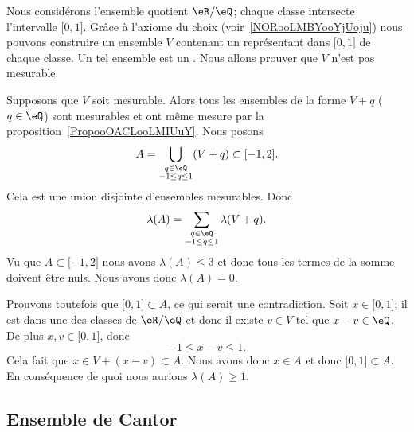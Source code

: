 \begin{example}      \label{EXooCZCFooRPgKjj}
    Nous considérons l'ensemble quotient \( \eR/\eQ\); chaque classe intersecte l'intervalle \( \mathopen[ 0 , 1 \mathclose]\). Grâce à l'axiome du choix (voir~\ref{NORooLMBYooYjUoju}) nous pouvons construire un ensemble \( V\) contenant un représentant dans \( \mathopen[ 0 , 1 \mathclose]\) de chaque classe. Un tel ensemble est un . Nous allons prouver que \( V\) n'est pas mesurable.

    Supposons que \( V\) soit mesurable. Alors tous les ensembles de la forme \( V+q\) (\( q\in \eQ\)) sont mesurables et ont même mesure par la proposition~\ref{PropooOACLooLMIUuY}. Nous posons
    \begin{equation}
        A=\bigcup_{\substack{q\in\eQ\\-1\leq q\leq 1}}(V+q)\subset\mathopen[ -1 , 2 \mathclose].
    \end{equation}
    Cela est une union disjointe d'ensembles mesurables. Donc
    \begin{equation}
        \lambda(A)=\sum_{\substack{q\in\eQ\\-1\leq q\leq 1}}\lambda(V+q).
    \end{equation}
    Vu que \( A\subset\mathopen[ -1 , 2 \mathclose]\) nous avons \( \lambda(A)\leq 3\) et donc tous les termes de la somme doivent être nuls. Nous avons donc \( \lambda(A)=0\).

    Prouvons toutefois que \( \mathopen[ 0 , 1 \mathclose]\subset A\), ce qui serait une contradiction. Soit \( x\in\mathopen[ 0 , 1 \mathclose]\); il est dans une des classes de \( \eR/\eQ\) et donc il existe \( v\in V\) tel que \( x-v\in \eQ\). De plus \( x,v\in \mathopen[ 0 , 1 \mathclose]\), donc
    \begin{equation}
        -1\leq x-v\leq 1.
    \end{equation}
    Cela fait que \( x\in V+(x-v)\subset A\). Nous avons donc \( x\in A\) et donc \( \mathopen[ 0 , 1 \mathclose]\subset A\). En conséquence de quoi nous aurions \( \lambda(A)\geq 1\).
\end{example}



\subsection{Ensemble de Cantor}

